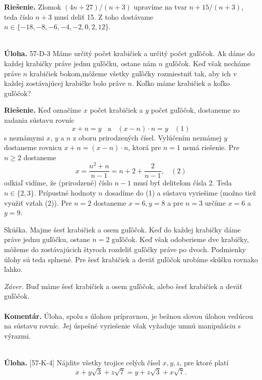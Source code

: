 \documentclass[11pt,a4paper,oneside,final]{book}
\newcommand{\kom}{\textbf{Komentár.} }
\newcommand{\ul}{\textbf{Úloha.} }
\newcommand{\rie}{\textbf{Riešenie.} }
\begin{document}
\rie Zlomok $(4n+27)/(n+3)$ upravíme na tvar $n+15/(n+3)$, teda číslo $n+3$ musí deliť 15. Z toho dostávame $n \in \{-18,-8,-6,-4,-2, 0, 2,12 \}$.\\
\\
\begin{tcolorbox}[breakable,notitle,boxrule=0pt,colback=light-gray,colframe=light-gray]\ul 57-D-3
Máme určitý počet krabičiek a určitý počet guľôčok. Ak dáme do každej krabičky práve jednu guľôčku, ostane nám $n$ guľôčok. Keď však necháme práve $n$ krabičiek bokom,môžeme všetky guľôčky rozmiestniť tak, aby ich v každej zostávajúcej krabičke bolo práve $n$. Koľko máme krabičiek a koľko guľôčok?

\end{tcolorbox}

\rie  Keď označíme $x$ počet krabičiek a $y$ počet guľôčok, dostaneme zo zadania sústavu rovníc
$$x + n = y \ \ \ \ \textrm{a} \ \ \ \ (x - n) \cdot n = y\ \ \ \ (1) $$
s neznámymi $x$, $y$ a $n$ z oboru prirodzených čísel. Vylúčením neznámej $y$ dostaneme rovnicu $x + n = (x - n) \cdot n$, ktorá pre $n = 1$ nemá riešenie. Pre $n \geq 2$ dostaneme
$$ x =\frac{n^2+n}{n-1}=n+2+\frac{2}{n-1}, \ \ \ \ (2)$$
odkiaľ vidíme, že (prirodzené) číslo $n - 1$ musí byť deliteľom čísla 2. Teda $n \in \{2, 3\}$.
Prípustné hodnoty $n$ dosadíme do (1) a sústavu vyriešime (možno tiež využiť vzťah (2)). Pre $n = 2$ dostaneme $x = 6, y = 8$ a pre $n = 3$ určíme $x = 6$ a $y = 9$.

Skúška. Majme šesť krabičiek a osem guľôčok. Keď do každej krabičky dáme práve jednu guľôčku, ostane $n = 2$ guľôčok. Keď však odoberieme dve krabičky, môžeme do zostávajúcich štyroch rozdeliť guľôčky práve po dvoch. Podmienky úlohy sú teda splnené. Pre šesť krabičiek a deväť guľôčok urobíme skúšku rovnako ľahko.

\textit{Záver.} Buď máme šesť krabičiek a osem guľôčok, alebo šesť krabičiek a deväť guľôčok.\\
\\
\kom Úloha, spolu s úlohou prípravnou, je bežnou slovou úlohou vedúcou na sústavu rovníc. Jej úspešné vyriešenie však vyžaduje umnú manipuláciu s výrazmi.\\
\\
\begin{tcolorbox}[breakable,notitle,boxrule=0pt,colback=light-gray,colframe=light-gray]\ul [57-K-4]
Nájdite všetky trojice celých čísel $x, y, z$, pre ktoré platí
$$x+y\sqrt{3}+z\sqrt{7}=y+z\sqrt{3}+x\sqrt{7}. $$
\end{tcolorbox}
\end{document}
